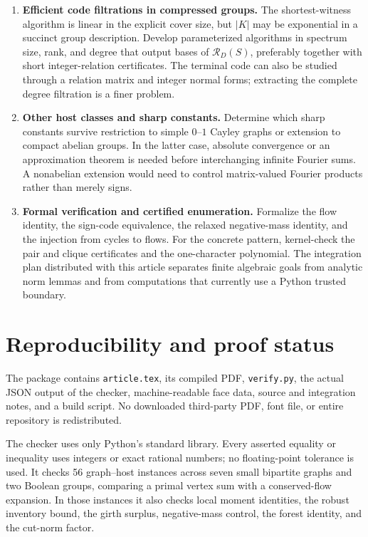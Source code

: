 \documentclass[11pt]{article}
\numberwithin{equation}{section}
\theoremstyle{definition}
\theoremstyle{remark}
\newcommand{\Rel}{\mathcal R}
\begin{document}
\begin{enumerate}[leftmargin=*,label=\textbf{Q\arabic*.}]
\item \textbf{Efficient code filtrations in compressed groups.}
The shortest-witness algorithm is linear in the explicit cover size,
but $|K|$ may be exponential in a succinct group description. Develop
parameterized algorithms in spectrum size, rank, and degree that output
bases of $\Rel_D(S)$, preferably together with short integer-relation
certificates. The terminal code can also be studied through a relation
matrix and integer normal forms; extracting the complete degree
filtration is a finer problem.

\item \textbf{Other host classes and sharp constants.}
Determine which sharp constants survive restriction to simple $0$--$1$
Cayley graphs or extension to compact abelian groups. In the latter
case, absolute convergence or an approximation theorem is needed before
interchanging infinite Fourier sums. A nonabelian extension would need
to control matrix-valued Fourier products rather than merely signs.

\item \textbf{Formal verification and certified enumeration.}
Formalize the flow identity, the sign-code equivalence, the relaxed
negative-mass identity, and the injection from cycles to flows. For the
concrete pattern, kernel-check the pair and clique certificates and the
one-character polynomial. The integration plan distributed with this
article separates finite algebraic goals from analytic norm lemmas and
from computations that currently use a Python trusted boundary.
\end{enumerate}

\section{Reproducibility and proof status}
\label{sec:validation}

The package contains \texttt{article.tex}, its compiled PDF,
\texttt{verify.py}, the actual JSON output of the checker, machine-readable
face data, source and integration notes, and a build script. No downloaded
third-party PDF, font file, or entire repository is redistributed.

The checker uses only Python's standard library. Every asserted equality
or inequality uses integers or exact rational numbers; no floating-point
tolerance is used. It checks 56 graph--host instances across seven small
bipartite graphs and two Boolean groups, comparing a primal vertex sum
with a conserved-flow expansion. In those instances it also checks local
moment identities, the robust inventory bound, the girth surplus,
negative-mass control, the forest identity, and the cut-norm factor.
\end{document}
